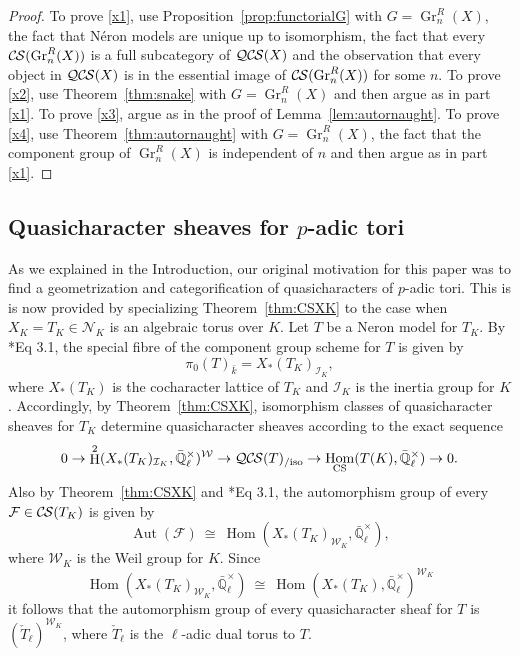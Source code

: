 \documentclass[10pt]{amsart}
\theoremstyle{plain}
\theoremstyle{definition}
\theoremstyle{remark}
\newcommand{\EE}{\mathbb{\bar Q}_\ell}
\newcommand{\bFq}{\bar{k}}
\newcommand{\EEx}{\EE^\times}
\newcommand{\Weil}[1]{\mathcal{W}_{#1}}
\DeclareMathOperator{\Aut}{Aut}
\DeclareMathOperator{\Hom}{Hom}
\DeclareMathOperator{\Gr}{Gr}
\DeclareMathOperator{\Hh}{H}
\newcommand{\iso}{{\ \cong\ }}
\newcommand{\cs}[1]{{\mathcal{#1}}}
\newcommand{\CS}{{\mathcal{C\hskip-0.8pt S}}}
\newcommand{\QCS}{{\mathcal{QC\hskip-0.8pt S}}}
\newcommand{\QCSiso}[1]{\QCS(#1)_{/\text{iso}}}
\begin{document}
\begin{proof}
To prove \ref{x1}, use Proposition~\ref{prop:functorialG} with $G = \Gr^R_n(X)$, the fact that N\'eron models are unique up to isomorphism, the fact that every $\CS(\Gr^R_n(X))$ is a full subcategory of $\QCS(X)$ and the observation that every object in $\QCS(X)$ is in the essential image of $\CS(\Gr^R_n(X))$ for some $n$.
To prove \ref{x2}, use Theorem~\ref{thm:snake} with $G = \Gr^R_n(X)$ and then argue as in part \ref{x1}.
To prove \ref{x3}, argue as in the proof of Lemma~\ref{lem:autornaught}.
To prove \ref{x4}, use Theorem~\ref{thm:autornaught} with $G = \Gr^R_n(X)$, the fact that the component group of $\Gr^R_n(X)$ is independent of $n$ and then argue as in part \ref{x1}.
\end{proof}

\subsection{Quasicharacter sheaves for $p$-adic tori} \label{ssec:CS_tori}

As we explained in the Introduction, our original motivation for this paper was to find a geometrization and categorification of quasicharacters of $p$-adic tori. 
This is is now provided by specializing Theorem~\ref{thm:CSXK} to the case when $X_K= T_K\in \mathcal{N}_K$ is an algebraic torus over $K$. 
Let $T$ be a Neron model for $T_K$.
By \cite{bitan:discriminant}*{Eq 3.1}, the special fibre of the component group scheme for $T$ is given by
\[
 \pi_0(T)_{\bFq} = X_*(T_K)_{\mathcal{I}_K},
\]
where $X_*(T_K)$ is the cocharacter lattice of $T_K$ and $\mathcal{I}_K$ is the inertia group for $K$.
Accordingly, by Theorem~\ref{thm:CSXK}, isomorphism classes of quasicharacter sheaves for $T_K$ determine quasicharacter sheaves according to the exact sequence
\[
0 \to \Hh^2(X_*(T_K)_{\mathcal{I}_K},\EEx)^{\Weil{}} \to \QCSiso{T} \to \Hom_\text{CS}(T(K),\EEx) \to 0.
\]
Also by Theorem~\ref{thm:CSXK} and \cite{bitan:discriminant}*{Eq 3.1}, the automorphism group of every $\cs{F} \in \CS(T_K)$ is given by 
\[
\Aut(\cs{F}) \iso \Hom(X_*(T_K)_{\Weil{K}},\EEx),
\]
where $\Weil{K}$ is the Weil group for $K$. 
Since 
\[
\Hom(X_*(T_K)_{\Weil{K}},\EEx) \iso \Hom(X_*(T_K),\EEx)^{\Weil{K}}
\]
it follows that the automorphism group of every quasicharacter sheaf for $T$ is $(\check{T}_\ell)^{\Weil{K}}$, where $\check{T}_\ell$ is the $\ell$-adic dual torus to $T$.
\end{document}
